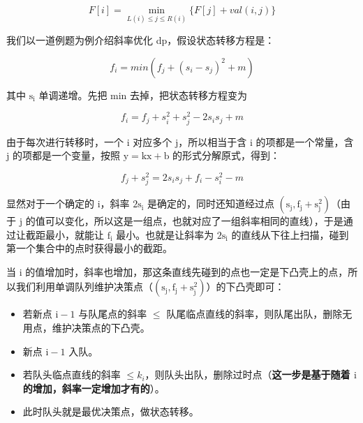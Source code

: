 \documentclass[UTF8]{article}
\begin{document}
$$
F[i] = \min\limits_{L(i) \le j \le R(i)} \{F[j] + val(i, j)\}
$$

我们以一道例题为例介绍斜率优化 dp，假设状态转移方程是：

$$
f_i = min(f_j + (s_i - s_j)^2 +m)
$$

其中 $\mathrm{s_i}$ 单调递增。先把 min 去掉，把状态转移方程变为

$$
f_i = f_j + s_i^2 + s_j^2 - 2s_is_j + m
$$

由于每次进行转移时，一个 $\mathrm{i}$ 对应多个 $\mathrm{j}$，所以相当于含 $\mathrm{i}$ 的项都是一个常量，含 $\mathrm{j}$ 的项都是一个变量，按照 $\mathrm{y = kx + b}$ 的形式分解原式，得到：

$$
f_j + s_j^2 = 2s_is_j + f_i - s_i^2 - m
$$

显然对于一个确定的 $\mathrm{i}$，斜率 $\mathrm{2s_i}$ 是确定的，同时还知道经过点 $\mathrm{(s_j, f_j + s_j ^ 2)}$（由于 $\mathrm{j}$ 的值可以变化，所以这是一组点，也就对应了一组斜率相同的直线），于是通过让截距最小，就能让 $\mathrm{f_i}$ 最小。也就是让斜率为 $\mathrm{2s_i}$ 的直线从下往上扫描，碰到第一个集合中的点时获得最小的截距。

当 $\mathrm{i}$ 的值增加时，斜率也增加，那这条直线先碰到的点也一定是下凸壳上的点，所以我们利用单调队列维护决策点（$\mathrm{(s_j, f_j + s_j ^ 2)}$）的下凸壳即可：

\begin{itemize}
	\item 若新点 $\mathrm{i - 1}$ 与队尾点的斜率 $\le$ 队尾临点直线的斜率，则队尾出队，删除无用点，维护决策点的下凸壳。
	\item 新点 $\mathrm{i - 1}$ 入队。
	\item 若队头临点直线的斜率 $\le k_i$，则队头出队，删除过时点（\textbf{这一步是基于随着 $\mathrm{i}$ 的增加，斜率一定增加才有的}）。
	\item 此时队头就是最优决策点，做状态转移。 
\end{itemize}
\end{document}
